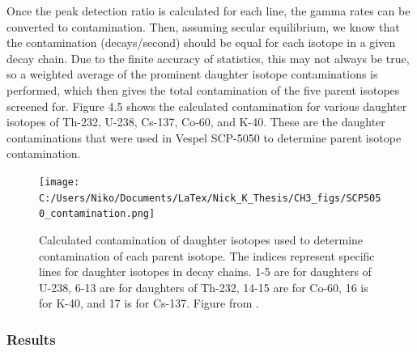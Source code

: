 \documentclass{report}
\begin{document}
Once the peak detection ratio is calculated for each line, the gamma rates can be converted to contamination. Then, assuming secular equilibrium, we know that the contamination (decays/second) should be equal for each isotope in a given decay chain. Due to the finite accuracy of statistics, this may not always be true, so a weighted average of the prominent daughter isotope contaminations is performed, which then gives the total contamination of the five parent isotopes screened for. Figure 4.5 shows the calculated contamination for various daughter isotopes of Th-232, U-238, Cs-137, Co-60, and K-40. These are the daughter contaminations that were used in Vespel SCP-5050 to determine parent isotope contamination.

\begin{figure}
\centering
\texttt{[image: C:/Users/Niko/Documents/LaTex/Nick\_K\_Thesis/CH3\_figs/SCP5050\_contamination.png]}
\caption{Calculated contamination of daughter isotopes used to determine contamination of each parent isotope. The indices represent specific lines for daughter isotopes in decay chains. 1-5 are for daughters of U-238, 6-13 are for daughters of Th-232, 14-15 are for Co-60, 16 is for K-40, and 17 is for Cs-137. Figure from \cite{GopherSCP5050}. }
\end{figure}

\subsubsection{Results}
\end{document}
